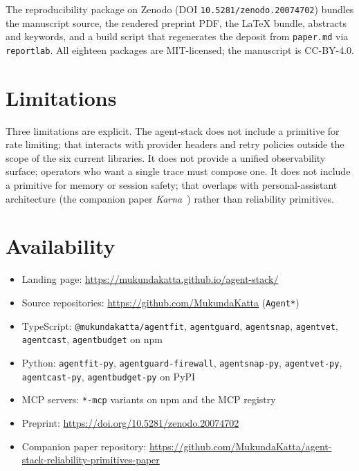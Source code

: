 \documentclass[sigconf,review]{acmart}
\begin{document}
The reproducibility package on Zenodo (DOI \texttt{10.5281/zenodo.20074702}) bundles the manuscript source, the rendered preprint PDF, the LaTeX bundle, abstracts and keywords, and a build script that regenerates the deposit from \texttt{paper.md} via \texttt{reportlab}. All eighteen packages are MIT-licensed; the manuscript is CC-BY-4.0.

\section{Limitations}

Three limitations are explicit. The agent-stack does not include a primitive for rate limiting; that interacts with provider headers and retry policies outside the scope of the six current libraries. It does not provide a unified observability surface; operators who want a single trace must compose one. It does not include a primitive for memory or session safety; that overlaps with personal-assistant architecture (the companion paper \emph{Karna}~\cite{karnapaper}) rather than reliability primitives.

\section{Availability}

\begin{itemize}
\item Landing page: \url{https://mukundakatta.github.io/agent-stack/}
\item Source repositories: \url{https://github.com/MukundaKatta} (\texttt{Agent*})
\item TypeScript: \texttt{@mukundakatta/agentfit}, \texttt{agentguard}, \texttt{agentsnap}, \texttt{agentvet}, \texttt{agentcast}, \texttt{agentbudget} on npm
\item Python: \texttt{agentfit-py}, \texttt{agentguard-firewall}, \texttt{agentsnap-py}, \texttt{agentvet-py}, \texttt{agentcast-py}, \texttt{agentbudget-py} on PyPI
\item MCP servers: \texttt{*-mcp} variants on npm and the MCP registry
\item Preprint: \url{https://doi.org/10.5281/zenodo.20074702}
\item Companion paper repository: \url{https://github.com/MukundaKatta/agent-stack-reliability-primitives-paper}
\end{itemize}
\end{document}
